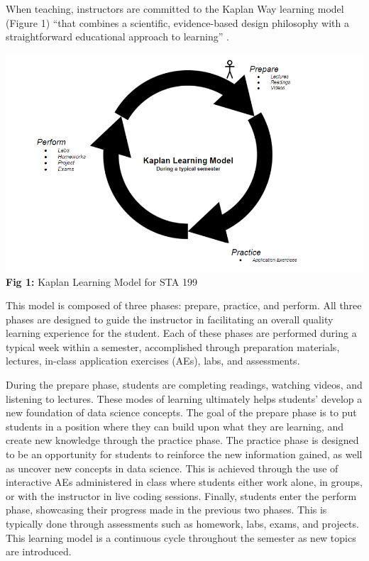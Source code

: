 \documentclass[
  12pt]{article}
\begin{document}
When teaching, instructors are committed to the Kaplan Way learning
model (Figure 1) ``that combines a scientific, evidence-based design
philosophy with a straightforward educational approach to learning''
\citep[pg. 3]{schweser_2023}.

\includegraphics{images/Kaplan.png} \textbf{Fig 1:} Kaplan Learning
Model for STA 199

This model is composed of three phases: prepare, practice, and perform.
All three phases are designed to guide the instructor in facilitating an
overall quality learning experience for the student. Each of these
phases are performed during a typical week within a semester,
accomplished through preparation materials, lectures, in-class
application exercises (AEs), labs, and assessments.

During the prepare phase, students are completing readings, watching
videos, and listening to lectures. These modes of learning ultimately
helps students' develop a new foundation of data science concepts. The
goal of the prepare phase is to put students in a position where they
can build upon what they are learning, and create new knowledge through
the practice phase. The practice phase is designed to be an opportunity
for students to reinforce the new information gained, as well as uncover
new concepts in data science. This is achieved through the use of
interactive AEs administered in class where students either work alone,
in groups, or with the instructor in live coding sessions. Finally,
students enter the perform phase, showcasing their progress made in the
previous two phases. This is typically done through assessments such as
homework, labs, exams, and projects. This learning model is a continuous
cycle throughout the semester as new topics are introduced.
\end{document}

